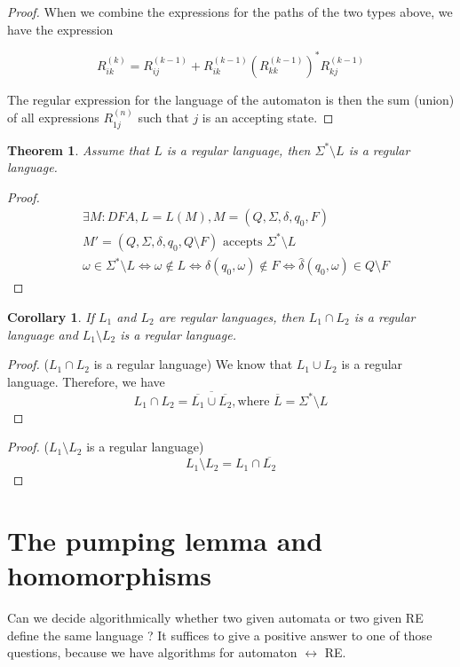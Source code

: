 \documentclass[a4paper,11pt]{article}
\newtheorem{thm}{Theorem}[section]
\newtheorem{cor}{Corollary}[section]
\begin{document}
\begin{proof}
  When we combine the expressions for the paths of the two types above, we have
  the expression

  \[
    R_{ik}^{(k)} = R_{ij}^{(k-1)} + R_{ik}^{(k-1)} (R_{kk}^{(k-1)})^* R_{kj}^{(k-1)}
  \]

  The regular expression for the language of the automaton is then the sum (union)
  of all expressions $R_{1j}^{(n)}$ such that $j$ is an accepting state.
\end{proof}

\begin{thm}
  Assume that $L$ is a regular language, then $\Sigma^* \setminus L$ is a
  regular language.
\end{thm}

\begin{proof}
  \begin{align*}
    & \exists M : DFA, L = L(M), M = (Q,\Sigma,\delta,q_0,F) \\
    & M' = (Q,\Sigma,\delta,q_0, Q \setminus F) \text{ accepts } \Sigma^* \setminus L \\
    & \omega \in \Sigma^* \setminus L \iff \omega \not \in L \iff \widehat{\delta}(q_0,\omega) \not \in F \iff \widehat{\delta}(q_0,\omega) \in Q \setminus F
  \end{align*}
\end{proof}

\begin{cor}
  If $L_1$ and $L_2$ are regular languages, then $L_1 \cap L_2$ is a regular
  language and $L_1 \setminus L_2$ is a regular language.
\end{cor}

\begin{proof}($L_1 \cap L_2$ is a regular language)
  We know that $L_1 \cup L_2$ is a regular language. Therefore, we have
  \[
    L_1 \cap L_2 = \overline{\overline{L_1} \cup \overline{L_2}}, \text{where }
    \overline{L} = \Sigma^* \setminus L
  \]
\end{proof}

\begin{proof}($L_1 \setminus L_2$ is a regular language)
  \[
    L_1 \setminus L_2 = L_1 \cap \overline{L_2}
  \]
\end{proof}

\section{The pumping lemma and homomorphisms}

Can we decide algorithmically whether two given automata or two given RE define
the same language ? It suffices to give a positive answer to one of those
questions, because we have algorithms for automaton $\leftrightarrow$ RE.
\end{document}
